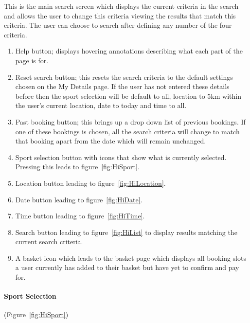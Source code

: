 
This is the main search screen which displays the current criteria in the
search and allows the user to change this criteria viewing the results that
match this criteria. The user can choose to search after defining any number of
the four criteria.
\begin{enumerate}
	\item Help button; displays hovering annotations describing what each part
		of the page is for.
	\item Reset search button; this resets the search criteria to the default
		settings chosen on the My Details page. If the user has not entered
		these details before then the sport selection will be default to all,
		location to 5km within the user's current location, date to today and
		time to all.
	\item Past booking button; this brings up a drop down list of previous
		bookings. If one of these bookings is chosen, all the search criteria
		will change to match that booking apart from the date which will remain
		unchanged.
	\item Sport selection button with icons that show what is currently
		selected.  Pressing this leads to figure~\ref{fig:HiSport}.
	\item Location button leading to figure~\ref{fig:HiLocation}.
	\item Date button leading to figure~\ref{fig:HiDate}.
	\item Time button leading to figure~\ref{fig:HiTime}.
	\item Search button leading to figure~\ref{fig:HiList} to display results
		matching the current search criteria.
	\item A basket icon which leads to the basket page which displays all
		booking slots a user currently has added to their basket but have yet
		to confirm and pay for.
\end{enumerate}

\paragraph{Sport Selection} (Figure~\ref{fig:HiSport})


